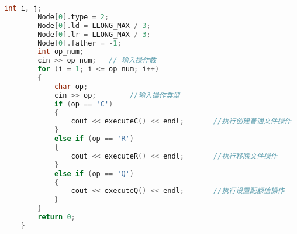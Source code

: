 \begin{lstlisting}[language=C++]
        int i, j;
        Node[0].type = 2;
        Node[0].ld = LLONG_MAX / 3;
        Node[0].lr = LLONG_MAX / 3;
        Node[0].father = -1;
        int op_num;
        cin >> op_num;   // 输入操作数
        for (i = 1; i <= op_num; i++)
        {
            char op;
            cin >> op;        //输入操作类型
            if (op == 'C')
            {
                cout << executeC() << endl;       //执行创建普通文件操作
            }
            else if (op == 'R')
            {
                cout << executeR() << endl;       //执行移除文件操作
            }
            else if (op == 'Q')
            {
                cout << executeQ() << endl;       //执行设置配额值操作
            }
        }
        return 0;
    }
    
\end{lstlisting}